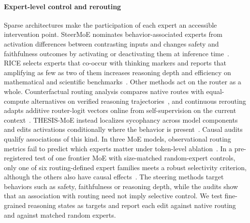 \paragraph{Expert-level control and rerouting}
Sparse architectures make the participation of each expert an accessible intervention point.
%
SteerMoE nominates behavior-associated experts from activation differences between contrasting inputs and changes safety and faithfulness outcomes by activating or deactivating them at inference time~\citep{fayyaz2025steermoe}.
%
RICE selects experts that co-occur with thinking markers and reports that amplifying as few as two of them increases reasoning depth and efficiency on mathematical and scientific benchmarks~\citep{wang2025rice}.
%
Other methods act on the router as a whole.
%
Counterfactual routing analysis compares native routes with equal-compute alternatives on verified reasoning trajectories~\citep{yoon2026misrouted}, and continuous rerouting adapts additive router-logit vectors online from self-supervision on the current context~\citep{su2026rewiring}.
%
THESIS-MoE instead localizes sycophancy across model components and edits activations conditionally where the behavior is present~\citep{hassani2026thesismoe}.
%
Causal audits qualify associations of this kind.
%
In three MoE models, observational routing metrics fail to predict which experts matter under token-level ablation~\citep{engmann2026observation}.
%
In a pre-registered test of one frontier MoE with size-matched random-expert controls, only one of six routing-defined expert families meets a robust selectivity criterion, although the others also have causal effects~\citep{salomone2026modular}.
%
The steering methods target behaviors such as safety, faithfulness or reasoning depth, while the audits show that an association with routing need not imply selective control.
%
We test fine-grained reasoning states as targets and report each edit against native routing and against matched random experts.
%

